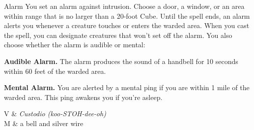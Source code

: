 \begin{Spell}[
    tags=Ritual,
    level=1st,
    time=1 Minute,
    range={30 ft/20 ft cube},
    components={V, S, M},
    duration=8 Hours,
    school=Abjuration,
    attack=None,
    effect=Detection
]{Alarm}
You set an alarm against intrusion. Choose a door, a window, or an area within range that is no larger than a 20-foot Cube. Until the spell ends, an alarm alerts you whenever a creature touches or enters the warded area. When you cast the spell, you can designate creatures that won't set off the alarm. You also choose whether the alarm is audible or mental:

\textbf{Audible Alarm.} The alarm produces the sound of a handbell for 10 seconds within 60 feet of the warded area.

\textbf{Mental Alarm.} You are alerted by a mental ping if you are within 1 mile of the warded area. This ping awakens you if you're asleep.

\begin{components}
V & \textit{Custodio (koo-STOH-dee-oh)} \\
M & a bell and silver wire
\end{components}
\end{Spell}
